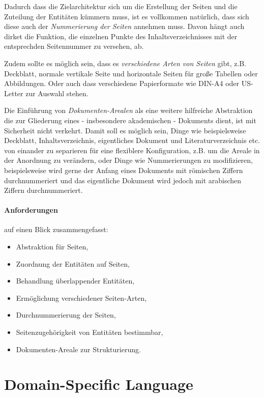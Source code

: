 Dadurch dass die Zielarchitektur sich um die Erstellung der Seiten und
die Zuteilung der Entitäten kümmern muss, ist es vollkommen natürlich,
dass sich diese auch der \emph{Nummerierung der Seiten} annehmen muss.
Davon hängt auch dirket die Funktion, die einzelnen Punkte des
Inhaltsverzeichnisses mit der entsprechden Seitennummer zu versehen, ab.

Zudem sollte es möglich sein, dass es \emph{verschiedene Arten von Seiten}
gibt, z.B. Deckblatt, normale vertikale Seite und horizontale Seiten für
große Tabellen oder Abbildungen. Oder auch dass verschiedene Papierformate
wie DIN-A4 oder US-Letter zur Auswahl stehen.

Die Einführung von \emph{Dokumenten-Arealen} als eine weitere hilfreiche
Abstraktion die zur Gliederung eines - insbesondere
akademischen - Dokuments dient, ist mit Sicherheit nicht verkehrt.
Damit soll es möglich sein, Dinge wie beispielsweise
Deckblatt, Inhaltsverzeichnis, eigentliches Dokument
und Literaturverzeichnis etc. von einander zu separieren für eine
flexiblere Konfiguration, z.B. um die Areale in der Anordnung zu
verändern, oder Dinge wie Nummerierungen zu modifizieren, beispielsweise
wird gerne der Anfang eines Dokuments mit römischen Ziffern durchnummeriert
und das eigentliche Dokument wird jedoch mit
arabischen Ziffern durchnummeriert.


\paragraph{Anforderungen} auf einen Blick zusammengefasst:

\begin{itemize}
  \item Abstraktion für Seiten,
  \item Zuordnung der Entitäten auf Seiten,
  \item Behandlung überlappender Entitäten,
  \item Ermöglichung verschiedener Seiten-Arten,
  \item Durchnummerierung der Seiten,
  \item Seitenzugehörigkeit von Entitäten bestimmbar,
  \item Dokumenten-Areale zur Strukturierung.
\end{itemize}


\section{Domain-Specific Language}\label{sec-dsl}

